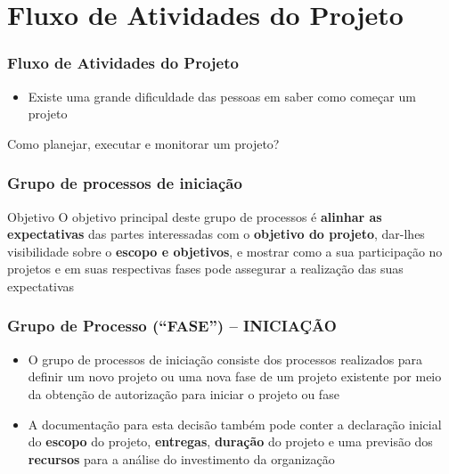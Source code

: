 

\section{Fluxo de Atividades do Projeto}
\begin{frame}
 \frametitle{Fluxo de Atividades do Projeto}
 \begin{itemize}
  \item Existe uma grande dificuldade das pessoas em saber como começar um projeto
 \end{itemize}
\begin{block}{}
 Como planejar, executar e monitorar um projeto?
\end{block}
\end{frame}

\begin{frame}
 \frametitle{Grupo de processos de iniciação}
 \begin{block}{Objetivo}
  O objetivo principal deste grupo de processos é \textbf{alinhar as expectativas} das partes interessadas com o \textbf{objetivo do projeto}, dar-lhes visibilidade
sobre o \textbf{escopo e objetivos}, e mostrar como a sua participação no projetos e em suas respectivas fases pode assegurar a realização das suas expectativas
 \end{block}

\end{frame}



  \begin{frame}
   \frametitle{Grupo de Processo (“FASE”) – INICIAÇÃO}
   \begin{itemize}
   \item O grupo de processos de iniciação consiste dos processos realizados para definir um novo projeto ou
uma nova fase de um projeto existente por meio da obtenção de autorização para iniciar o projeto ou fase

    \item A documentação para esta decisão também pode conter a declaração inicial do \textbf{escopo} do projeto, \textbf{entregas}, \textbf{duração} do projeto e uma previsão dos \textbf{recursos}
para a análise do investimento da organização
   \end{itemize}

  \end{frame}
  
